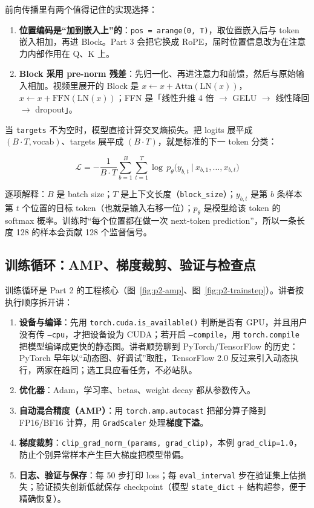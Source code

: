 前向传播里有两个值得记住的实现选择：

\begin{enumerate}
\item \textbf{位置编码是“加到嵌入上”的}：\texttt{pos = arange(0, T)}，取位置嵌入后与 token 嵌入相加，再进 Block。Part 3 会把它换成 RoPE，届时位置信息改为在注意力内部作用在 Q、K 上。
\item \textbf{Block 采用 pre-norm 残差}：先归一化、再进注意力和前馈，然后与原始输入相加。视频里展开的 Block 是 $x \leftarrow x + \mathrm{Attn}(\mathrm{LN}(x))$，$x \leftarrow x + \mathrm{FFN}(\mathrm{LN}(x))$；FFN 是「线性升维 4 倍 $\rightarrow$ GELU $\rightarrow$ 线性降回 $\rightarrow$ dropout」。
\end{enumerate}

当 \texttt{targets} 不为空时，模型直接计算交叉熵损失。把 logits 展平成 $(B\cdot T, \text{vocab})$、targets 展平成 $(B\cdot T)$，就是标准的下一 token 分类：

$$\mathcal{L} = -\frac{1}{B\cdot T}\sum_{b=1}^{B}\sum_{t=1}^{T}\log\, p_\theta\big(y_{b,t}\ \big|\ x_{b,1},\dots,x_{b,t}\big)$$

逐项解释：$B$ 是 batch size；$T$ 是上下文长度（\texttt{block\_size}）；$y_{b,t}$ 是第 $b$ 条样本第 $t$ 个位置的目标 token（也就是输入右移一位）；$p_\theta$ 是模型给该 token 的 softmax 概率。训练时“每个位置都在做一次 next-token prediction”，所以一条长度 128 的样本会贡献 128 个监督信号。

\subsection{训练循环：AMP、梯度裁剪、验证与检查点}

训练循环是 Part 2 的工程核心（图~\ref{fig:p2-amp}、图~\ref{fig:p2-trainstep}）。讲者按执行顺序拆开讲：

\begin{enumerate}
\item \textbf{设备与编译}：先用 \texttt{torch.cuda.is\_available()} 判断是否有 GPU，并且用户没有传 \texttt{--cpu}，才把设备设为 CUDA；若开启 \texttt{--compile}，用 \texttt{torch.compile} 把模型编译成更快的静态图。讲者顺势聊到 PyTorch/TensorFlow 的历史：PyTorch 早年以“动态图、好调试”取胜，TensorFlow 2.0 反过来引入动态执行，两家在趋同；选工具应看任务，不必站队。
\item \textbf{优化器}：Adam，学习率、betas、weight decay 都从参数传入。
\item \textbf{自动混合精度（AMP）}：用 \texttt{torch.amp.autocast} 把部分算子降到 FP16/BF16 计算，用 \texttt{GradScaler} 处理\textbf{梯度下溢}。
\item \textbf{梯度裁剪}：\texttt{clip\_grad\_norm\_(params, grad\_clip)}，本例 \texttt{grad\_clip=1.0}，防止个别异常样本产生巨大梯度把模型带偏。
\item \textbf{日志、验证与保存}：每 50 步打印 loss；每 \texttt{eval\_interval} 步在验证集上估损失；验证损失创新低就保存 checkpoint（模型 \texttt{state\_dict} + 结构超参，便于精确恢复）。
\end{enumerate}

